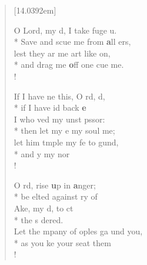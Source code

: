 \begin{flushleft}
\begin{verse}[14.0392em]

 O Lord, my d, I take fuge  u.\\*
Save and scue me from \textbf{a}ll  ers,\\
 lest they ar me art like  on,\\*
and drag me \textbf{o}ff   one  cue me.\\!

 If I have ne this, O rd,  d,\\*
 if I have id back \textbf{e}  \\
I who ved my unst pssor:\\*
 then let my e  my soul   me;\\
let him tmple my fe to  gund,\\*
and y my nor   \\!

 O rd, rise \textbf{u}p in  \textbf{a}nger;\\*
be elted against  ry of  \\
Ake, my d, to ct\\*
the s  dered.\\
 Let the mpany of oples ga und you,\\*
as you ke your seat  them  \\!


\end{verse}
\end{flushleft}
